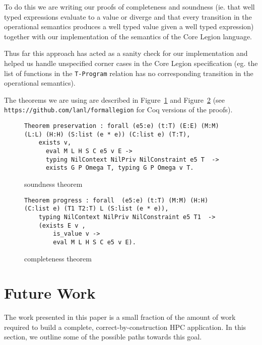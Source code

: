 \documentclass[sigconf]{acmart}
\begin{document}
To do this we are writing our proofs of completeness and soundness (ie. that well
typed expressions evaluate to a value or diverge and that every transition in
the operational semantics produces a well typed value given a well typed
expression) together with our implementation of the semantics of the Core
Legion language.

Thus far this approach has acted as a sanity check for our implementation and
helped us handle unspecified corner cases in the Core Legion specification (eg.
the list of functions in the \texttt{T-Program} relation has no corresponding
transition in the operational semantics). 

The theorems we are using are described in Figure~\ref{soundnesstheorem} and
Figure~\ref{completenesstheorem} (see \texttt{https://github.com/lanl/formallegion}
for Coq versions of the proofs). 

\begin{figure}
\begin{BVerbatim}
Theorem preservation : forall (e5:e) (t:T) (E:E) (M:M) 
(L:L) (H:H) (S:list (e * e)) (C:list e) (T:T),
    exists v,
      eval M L H S C e5 v E ->
      typing NilContext NilPriv NilConstraint e5 T  ->
      exists G P Omega T, typing G P Omega v T.
\end{BVerbatim}
\caption{soundness theorem}
\label{soundnesstheorem}
\end{figure}

\begin{figure}
\begin{BVerbatim}
Theorem progress : forall  (e5:e) (t:T) (M:M) (H:H)  
(C:list e) (T1 T2:T) L (S:list (e * e)),
    typing NilContext NilPriv NilConstraint e5 T1  ->
    (exists E v ,
        is_value v ->
        eval M L H S C e5 v E).
\end{BVerbatim}
\caption{completeness theorem}
\label{completenesstheorem}
\end{figure}


\section{Future Work}

The work presented in this paper is a small fraction of the
amount of work required to build a complete, correct-by-construction HPC
application. In this section, we outline some of the possible paths towards
this goal. 
\end{document}
